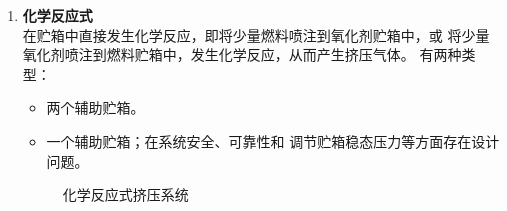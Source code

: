 \begin{enumerate}[\hspace*{1.5em} (1) ]
	\item \textbf{化学反应式}\\
	在贮箱中直接发生化学反应，即将少量燃料喷注到氧化剂贮箱中，或
将少量氧化剂喷注到燃料贮箱中，发生化学反应，从而产生挤压气体。
有两种类型：
	\vspace*{-0.5em}
	\begin{itemize}
		\item \blue[双直接喷注式]\quad 两个辅助贮箱。
		\item \blue[串联直接喷注式]\quad 一个辅助贮箱；在系统安全、可靠性和 调节贮箱稳态压力等方面存在设计问题。
	\end{itemize}
	\begin{figure}[!htb]
		\centering
	\caption{化学反应式挤压系统}
	\end{figure}
\end{enumerate}



